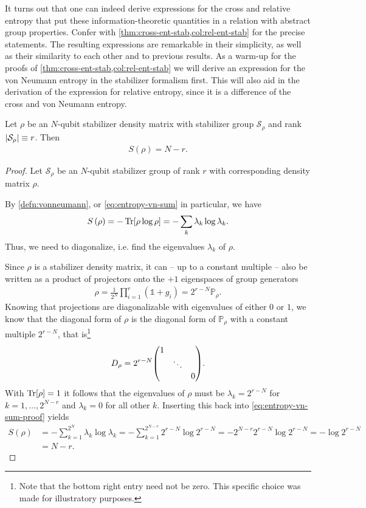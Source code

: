 It turns out that one can indeed derive expressions for the cross and relative
entropy that put these information-theoretic quantities in a relation with
abstract group properties. Confer with
\cref{thm:cross-ent-stab,col:rel-ent-stab} for the precise statements. The
resulting expressions are remarkable in their simplicity, as well as their
similarity to each other and to previous results. As a warm-up for the proofs
of \cref{thm:cross-ent-stab,col:rel-ent-stab} we will derive an expression for
the von Neumann entropy in the stabilizer formalism first. This will also aid
in the derivation of the expression for relative entropy, since it is a
difference of the cross and von Neumann entropy.

\begin{lem}\label{lem:vn-ent-stab}
  Let $\rho$ be an $N$-qubit stabilizer density matrix with stabilizer group
  $\mathcal{S}_\rho$ and rank $\abs{\mathcal{S}_\rho} \equiv r$. Then
  \begin{align}
    S\left( \rho \right) = N - r
  .\end{align}
\end{lem}
\begin{proof}
  Let $\mathcal{S}_\rho$ be an $N$-qubit stabilizer group of rank $r$ with
  corresponding density matrix $\rho$.

  By \cref{defn:vonneumann}, or \cref{eq:entropy-vn-sum} in particular, we have
  \begin{align}\label{eq:entropy-vn-sum-proof}
    S\left( \rho \right) = -\Tr[\rho\log\rho] = -\sum_k \lambda_k \log
    \lambda_k
  .\end{align}
  Thus, we need to diagonalize, i.e. find the eigenvalues $\lambda_k$ of
  $\rho$.

  Since $\rho$ is a stabilizer density matrix, it can -- up to a constant
  multiple -- also be written as a
  product of projectors onto the $+1$ eigenspaces of group generators
  \begin{align}
    \rho = \frac{1}{2^N} \prod_{i=1}^r (\mathds{1} + g_i) = 2^{r-N} \mathbb{P}_\rho
  .\end{align}
  Knowing that projections are diagonalizable with eigenvalues of either $0$ or
  $1$, we know that the diagonal form of $\rho$ is the diagonal form of
  $\mathbb{P}_\rho$ with a constant multiple $2^{r-N}$, that is\footnote{Note that
    the bottom right entry need not be zero. This specific choice was made for
  illustratory purposes.}
  \begin{align}
    D_\rho = 2^{r-N} \mqty(\dmat{1,\ddots,0})
  .\end{align}
  With $\Tr[\rho] = 1$ it follows that the eigenvalues of $\rho$ must be
  $\lambda_k = 2^{r-N}$ for $k =1,\ldots,2^{N-r}$ and
  $\lambda_k = 0$ for all other $k$.
  Inserting this back into \cref{eq:entropy-vn-sum-proof} yields
  \begin{align*}
    S\left( \rho \right) 
      &= -\sum_{k=1}^{2^N} \lambda_k \log \lambda_k 
      = -\sum_{k=1}^{2^{N-r}} 2^{r-N} \log 2^{r-N} 
      = -2^{N-r} 2^{r-N} \log 2^{r-N} 
      = -\log 2^{r-N} \\
      &= N-r
  .\end{align*}
\end{proof}
